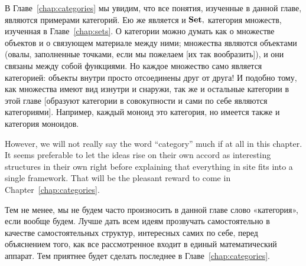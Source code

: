 \documentclass[../main/CT4S-EN-RU]{subfiles}
\begin{document}
\begin{blockRUS}
В Главе~\ref{chap:categories} мы увидим, что все понятия, изученные в данной главе, являются примерами категорий. Ею же является и ${\mathbf{Set}},$ категория множеств, изученная в Главе~\ref{chap:sets}. О категории можно думать как о множестве объектов и о связующем материале между ними; множества являются объектами (овалы, заполненные точками, если мы пожелаем [их так вообразить]), и они связаны между собой функциями. Но каждое множество само является категорией: объекты внутри просто отсоединены друг от друга! И подобно тому, как множества имеют вид изнутри и снаружи, так же и остальные категории в этой главе [образуют категории в совокупности и сами по себе являются категориями]. Например, каждый моноид это категория, но имеется также и категория моноидов. 
\end{blockRUS}

\begin{blockENG}
However, we will not really say the word “category” much if at all in this chapter. It seems preferable to let the ideas rise on their own accord as interesting structures in their own right before explaining that everything in site fits into a single framework. That will be the pleasant reward to come in Chapter~\ref{chap:categories}.
\end{blockENG}

\begin{blockRUS}
Тем не менее, мы не будем часто произносить в данной главе слово «категория», если вообще будем. Лучше дать всем идеям прозвучать самостоятельно в качестве самостоятельных структур, интересных самих по себе, перед объяснением того, как все рассмотренное входит в единый математический аппарат. Тем приятнее будет сделать последнее в Главе~\ref{chap:categories}.
\end{blockRUS}
\end{document}
